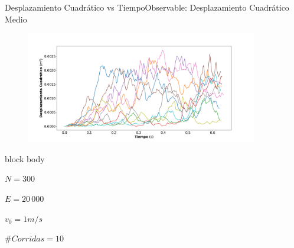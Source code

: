 \documentclass{beamer}
\begin{document}
            \begin{frame}{Desplazamiento Cuadrático vs Tiempo}{Observable: Desplazamiento Cuadrático Medio}
                \begin{figure}[H!]
                    \includegraphics[width=0.9\textwidth]{./dc_vs_time_1}
                    \label{fig:dcm_1}
                \end{figure}
                \begin{beamercolorbox}[sep=5pt,center]{block body}
                    \begin{minipage}[t]{0.24\textwidth}
                        \centering
                        \small{$N=300$}
                    \end{minipage}
                    \hfill
                    \begin{minipage}[t]{0.24\textwidth}
                        \centering
                        \small{$E=20\,000$}
                    \end{minipage}
                    \hfill
                    \begin{minipage}[t]{0.24\textwidth}
                        \centering
                        \small{$v_0 = 1 m/s$}
                    \end{minipage}
                    \hfill
                    \begin{minipage}[t]{0.24\textwidth}
                        \centering
                        \small{$\#Corridas = 10$}
                    \end{minipage}
                \end{beamercolorbox}
            \end{frame}
\end{document}
